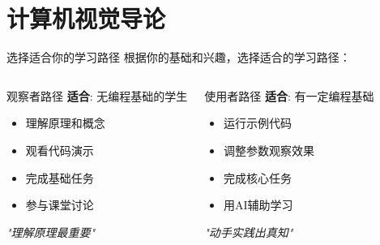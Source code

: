 
\section{计算机视觉导论}

\begin{frame}{选择适合你的学习路径}
    根据你的基础和兴趣，选择适合的学习路径：

    \begin{columns}[t]
        \begin{block}{观察者路径}
            \textbf{适合}: 无编程基础的学生
            \vspace{0.2cm}
            \begin{itemize}
                \small
                \item 理解原理和概念
                \item 观看代码演示
                \item 完成基础任务
                \item 参与课堂讨论
            \end{itemize}
            \vspace{0.2cm}
            \centering
            \textit{"理解原理最重要"}
        \end{block}

        \begin{block}{使用者路径}
            \textbf{适合}: 有一定编程基础
            \vspace{0.2cm}
            \begin{itemize}
                \small
                \item 运行示例代码
                \item 调整参数观察效果
                \item 完成核心任务
                \item 用AI辅助学习
            \end{itemize}
            \vspace{0.2cm}
            \centering
            \textit{"动手实践出真知"}
        \end{block}


\end{columns}
\end{frame}
